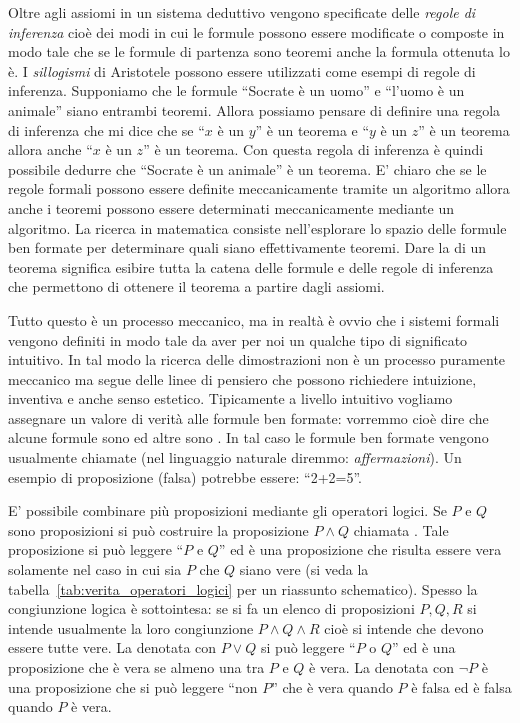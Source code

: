 Oltre agli assiomi in un sistema deduttivo vengono specificate delle 
\emph{regole di inferenza} cioè dei modi in cui 
le formule possono essere modificate o composte in modo tale che se le formule 
di partenza sono teoremi anche la formula ottenuta lo è.
I \emph{sillogismi} di Aristotele possono essere utilizzati come esempi di regole 
di inferenza. Supponiamo che le formule ``Socrate è un uomo'' e ``l'uomo è un animale''
siano entrambi teoremi. Allora possiamo pensare di definire una regola di inferenza 
che mi dice che se ``$x$ è un $y$'' è un teorema e ``$y$ è un $z$'' 
è un teorema allora anche ``$x$ è un $z$'' è un teorema. 
Con questa regola di inferenza è quindi possibile dedurre che ``Socrate è un animale''
è un teorema.
E' chiaro che se le regole formali possono essere definite meccanicamente 
tramite un algoritmo allora anche i teoremi possono essere determinati meccanicamente 
mediante un algoritmo.
La ricerca in matematica consiste nell'esplorare lo spazio delle formule ben formate 
per determinare quali siano effettivamente teoremi. 
Dare la  di un teorema significa esibire tutta la catena delle formule 
e delle regole di inferenza che permettono di ottenere il teorema a partire dagli 
assiomi.

Tutto questo è un processo meccanico, ma in realtà è ovvio che i sistemi formali 
vengono definiti in modo tale da aver per noi un qualche tipo di significato intuitivo.
In tal modo la ricerca delle dimostrazioni non è un processo puramente meccanico 
ma segue delle linee di pensiero che possono richiedere intuizione, inventiva e anche 
senso estetico. 
Tipicamente a livello intuitivo vogliamo assegnare un valore di verità alle formule 
ben formate: vorremmo cioè dire che alcune formule sono 
ed altre sono 
. 
In tal caso le formule ben formate vengono usualmente chiamate 
(nel linguaggio naturale diremmo: \emph{affermazioni}).
Un esempio di proposizione (falsa) potrebbe essere: ``2+2=5''.

E' possibile combinare più proposizioni mediante
gli operatori logici. Se $P$ e $Q$ sono proposizioni
si può costruire la proposizione $P \land Q$
chiamata .
Tale proposizione
si può leggere ``$P$ e $Q$'' ed è una proposizione
che risulta essere vera solamente nel caso in cui sia
$P$ che $Q$ siano vere
(si veda la tabella~\ref{tab:verita_operatori_logici}
per un riassunto schematico).
Spesso la congiunzione logica è sottointesa:
se si fa un elenco di proposizioni $P,Q,R$ 
si intende usualmente la loro congiunzione $P \land Q \land R$
cioè si intende che devono essere tutte vere.
La  denotata
con $P \lor Q$
si può leggere ``$P$ o $Q$'' ed è una proposizione che
è vera se almeno una tra $P$ e $Q$ è vera.
La  denotata con $\lnot P$ è una
proposizione che si può leggere ``non $P$'' che
è vera quando $P$ è falsa ed è falsa quando $P$ è vera.

